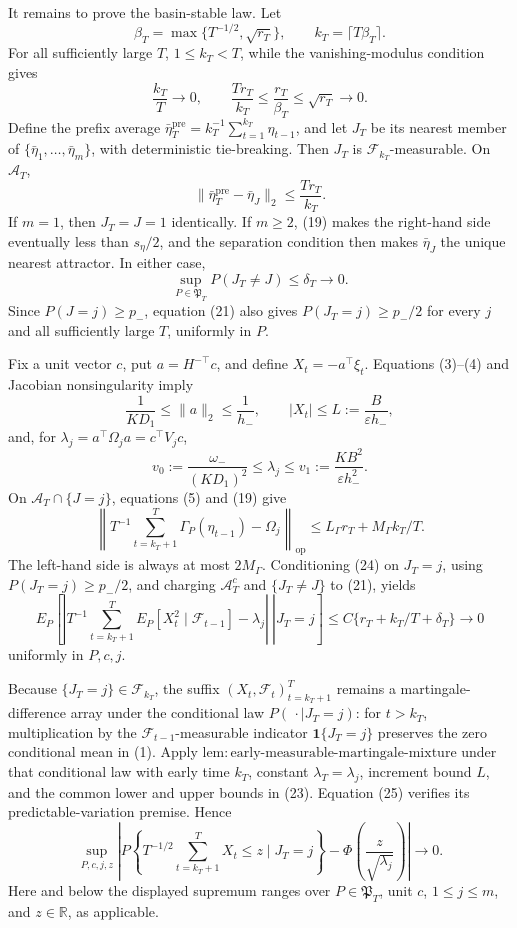 It remains to prove the basin-stable law. Let
\[
 \beta_T=\max\{T^{-1/2},\sqrt{r_T}\},
 \qquad k_T=\lceil T\beta_T\rceil.
\tag{18}
\]
For all sufficiently large \(T\), \(1\le k_T<T\), while the vanishing-modulus condition gives
\[
 \frac{k_T}{T}\longrightarrow0,
 \qquad \frac{Tr_T}{k_T}\le\frac{r_T}{\beta_T}\le\sqrt{r_T}\longrightarrow0.
\tag{19}
\]
Define the prefix average \(\bar\eta_T^{\mathrm{pre}}=k_T^{-1}\sum_{t=1}^{k_T}\eta_{t-1}\), and let \(J_T\) be its nearest member of \(\{\bar\eta_1,\ldots,\bar\eta_m\}\), with deterministic tie-breaking. Then \(J_T\) is \(\mathcal F_{k_T}\)-measurable. On \(\mathcal A_T\),
\[
 \|\bar\eta_T^{\mathrm{pre}}-\bar\eta_J\|_2
 \le\frac{Tr_T}{k_T}.
\tag{20}
\]
If \(m=1\), then \(J_T=J=1\) identically. If \(m\ge2\), (19) makes the right-hand side eventually less than \(s_\eta/2\), and the separation condition then makes \(\bar\eta_J\) the unique nearest attractor. In either case,
\[
 \sup_{P\in\mathfrak P_T}P(J_T\ne J)\le\delta_T\longrightarrow0.
\tag{21}
\]
Since \(P(J=j)\ge p_-\), equation (21) also gives \(P(J_T=j)\ge p_-/2\) for every \(j\) and all sufficiently large \(T\), uniformly in \(P\).

Fix a unit vector \(c\), put \(a=H^{-\top}c\), and define \(X_t=-a^\top\xi_t\). Equations (3)--(4) and Jacobian nonsingularity imply
\[
 \frac1{KD_1}\le\|a\|_2\le\frac1{h_-},
 \qquad |X_t|\le L:=\frac{B}{\varepsilon h_-},
\tag{22}
\]
and, for \(\lambda_j=a^\top\Omega_ja=c^\top V_jc\),
\[
 v_0:=\frac{\omega_-}{(KD_1)^2}\le\lambda_j
 \le v_1:=\frac{KB^2}{\varepsilon h_-^2}.
\tag{23}
\]
On \(\mathcal A_T\cap\{J=j\}\), equations (5) and (19) give
\[
 \left\|T^{-1}\sum_{t=k_T+1}^T\Gamma_P(\eta_{t-1})-\Omega_j\right\|_{\mathrm{op}}
 \le L_\Gamma r_T+M_\Gamma k_T/T.
\tag{24}
\]
The left-hand side is always at most \(2M_\Gamma\). Conditioning (24) on \(J_T=j\), using \(P(J_T=j)\ge p_-/2\), and charging \(\mathcal A_T^c\) and \(\{J_T\ne J\}\) to (21), yields
\[
 E_P\!\left[\left.\left|T^{-1}\sum_{t=k_T+1}^T
 E_P[X_t^2\mid\mathcal F_{t-1}]-\lambda_j\right|\ \right|J_T=j\right]
 \le C\{r_T+k_T/T+\delta_T\}\longrightarrow0
\tag{25}
\]
uniformly in \(P,c,j\).

Because \(\{J_T=j\}\in\mathcal F_{k_T}\), the suffix \((X_t,\mathcal F_t)_{t=k_T+1}^T\) remains a martingale-difference array under the conditional law \(P(\,\cdot\mid J_T=j)\): for \(t>k_T\), multiplication by the \(\mathcal F_{t-1}\)-measurable indicator \(\mathbf1\{J_T=j\}\) preserves the zero conditional mean in (1). Apply \(\mathrm{lem:early\text{-}measurable\text{-}martingale\text{-}mixture}\) under that conditional law with early time \(k_T\), constant \(\lambda_T=\lambda_j\), increment bound \(L\), and the common lower and upper bounds in (23). Equation (25) verifies its predictable-variation premise. Hence
\[
 \sup_{P,c,j,z}\left|P\!\left\{T^{-1/2}\sum_{t=k_T+1}^TX_t\le z\mid J_T=j\right\}
 -\Phi\!\left(\frac z{\sqrt{\lambda_j}}\right)\right|\longrightarrow0.
\tag{26}
\]
Here and below the displayed supremum ranges over \(P\in\mathfrak P_T\), unit \(c\), \(1\le j\le m\), and \(z\in\mathbb R\), as applicable.

